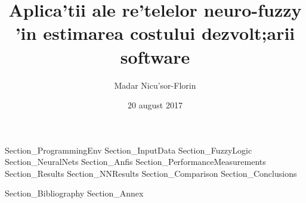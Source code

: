 \documentclass[10pt]{article}
\title{Aplica'tii ale re'telelor neuro-fuzzy 'in estimarea costului dezvolt;arii software}
\date{20 august 2017}
\author{Madar Nicu'sor-Florin}
\numberwithin{equation}{section}
\numberwithin{figure}{section}
\numberwithin{table}{section}
\begin{document}
\newpage
\thispagestyle{empty}
\mbox{}
\newpage


\newpage

\newpage
\thispagestyle{empty}
\mbox{}
\newpage

\tableofcontents
\newpage




 {Section_ProgrammingEnv}
 {Section_InputData}
 {Section_FuzzyLogic}
 {Section_NeuralNets}
 {Section_Anfis}
 {Section_PerformanceMeasurements}
 {Section_Results}
 {Section_NNResults}
 {Section_Comparison}
 {Section_Conclusions}




 {Section_Bibliography}
 {Section_Annex}
\newpage
\thispagestyle{empty}
\mbox{}
\newpage
\end{document}
